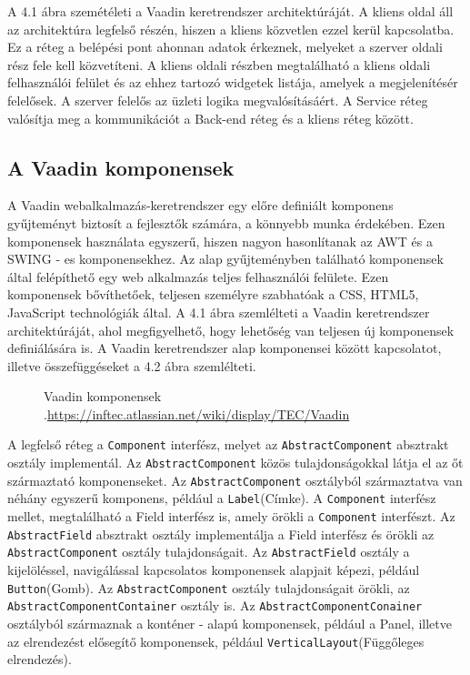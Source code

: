 A 4.1 ábra szemétéleti a Vaadin keretrendszer architektúráját.
A kliens oldal áll az architektúra legfelső részén, hiszen a kliens közvetlen ezzel kerül kapcsolatba. Ez a réteg a belépési pont ahonnan adatok érkeznek, melyeket a szerver oldali rész fele kell közvetíteni. A kliens oldali részben megtalálható a kliens oldali felhasználói felület és az ehhez tartozó widgetek listája, amelyek a megjelenítésér felelősek. 
A szerver felelős az üzleti logika megvalósításáért. A Service réteg valósítja meg a kommunikációt a Back-end réteg és a kliens réteg között. 


\subsection{A Vaadin komponensek}\label{sec:Vaadin komponensek}

A Vaadin webalkalmazás-keretrendszer egy előre definiált komponens gyűjteményt biztosít a fejlesztők számára, a könnyebb munka érdekében. Ezen komponensek használata egyszerű, hiszen nagyon hasonlítanak az AWT és a SWING  - es komponensekhez. Az alap gyűjteményben található komponensek által felépíthető egy web alkalmazás teljes felhasználói felülete. Ezen komponensek bővíthetőek, teljesen személyre szabhatóak a CSS, HTML5, JavaScript technológiák által. A 4.1 ábra szemlélteti a Vaadin keretrendszer architektúráját, ahol megfigyelhető, hogy lehetőség van teljesen új komponensek definiálására is.
A Vaadin keretrendszer alap komponensei között kapcsolatot, illetve összefüggéseket a 4.2 ábra szemlélteti. 
\begin{figure}[h!]
  \centering
  \caption[Vaadin keretrendszer komponensei]%
  {Vaadin komponensek\\
  {\white .}\hfill\url{https://inftec.atlassian.net/wiki/display/TEC/Vaadin}}
  \label{fig:vaadinComponents}
\end{figure} 

A legfelső réteg a \texttt{Component} interfész, melyet az \texttt{AbstractComponent} absztrakt osztály implementál. Az \texttt{AbstractComponent} közös tulajdonságokkal látja el az őt származtató komponenseket. Az \texttt{AbstractComponent} osztályból származtatva van néhány egyszerű komponens, például a \texttt{Label}(Címke). A \texttt{Component} interfész mellet, megtalálható a Field interfész is, amely örökli a \texttt{Component} interfészt. Az \texttt{AbstractField} absztrakt osztály implementálja a Field interfész és örökli az \texttt{AbstractComponent} osztály tulajdonságait. Az \texttt{AbstractField} osztály a kijelöléssel, navigálással kapcsolatos komponensek alapjait képezi, például \texttt{Button}(Gomb). Az \texttt{AbstractComponent} osztály tulajdonságait örökli, az \texttt{AbstractComponentContainer} osztály is. Az \texttt{AbstractComponentConainer} osztályból származnak a konténer - alapú komponensek, például a Panel, illetve az elrendezést elősegítő komponensek, például \texttt{VerticalLayout}(Függőleges elrendezés).



